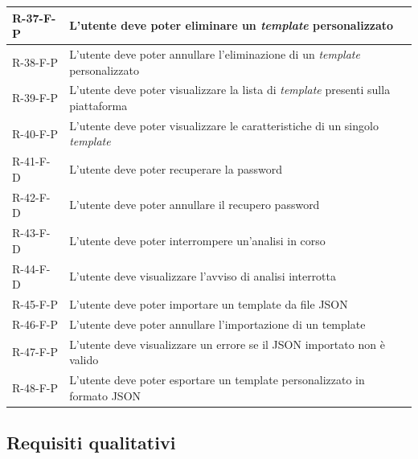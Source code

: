 \begin{xltabular}{\textwidth}{lXl}
    R-37-F-P & L'utente deve poter eliminare un \emph{template} personalizzato &  \\ \hline
    R-38-F-P & L'utente deve poter annullare l'eliminazione di un \emph{template} personalizzato &  \\ \hline
    R-39-F-P & L'utente deve poter visualizzare la lista di \emph{template} presenti sulla piattaforma &  \\ \hline
    R-40-F-P & L'utente deve poter visualizzare le caratteristiche di un singolo \emph{template} &  \\ \hline
    R-41-F-D & L'utente deve poter recuperare la password &  \\ \hline
    R-42-F-D & L'utente deve poter annullare il recupero password &  \\ \hline
    R-43-F-D & L'utente deve poter interrompere un'analisi in corso &  \\ \hline
    R-44-F-D & L'utente deve visualizzare l'avviso di analisi interrotta &  \\ \hline
    R-45-F-P & L'utente deve poter importare un template da file JSON &  \\ \hline
    R-46-F-P & L'utente deve poter annullare l'importazione di un template &  \\ \hline
    R-47-F-P & L'utente deve visualizzare un errore se il JSON importato non è valido &  \\ \hline
    R-48-F-P & L'utente deve poter esportare un template personalizzato in formato JSON &  \\

\end{xltabular}
\newpage
\subsection{Requisiti qualitativi}

